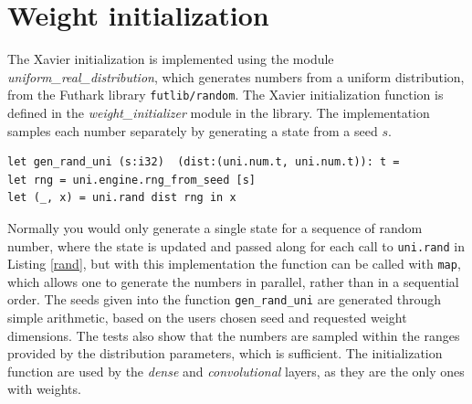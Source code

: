 \section{Weight initialization}
The Xavier initialization is implemented using the module
\textit{uniform\_real\_distribution}, which generates numbers from a uniform
distribution, from the Futhark library \texttt{futlib/random}. 
The Xavier initialization function is defined in the
\textit{weight\_initializer} module in the library. 
The implementation samples each number separately by generating a state from a
seed $s$. 
\begin{lstlisting}[caption = {Function for sampling a uniform number from the
seed $s$, by generating a state in line 2, which is used to sample the number in
line 3}, 	label = {rand} ]
let gen_rand_uni (s:i32)  (dist:(uni.num.t, uni.num.t)): t =
let rng = uni.engine.rng_from_seed [s]
let (_, x) = uni.rand dist rng in x
\end{lstlisting}
Normally you would only generate a single state for a sequence of random number,
where the state is updated and passed along for each call to \texttt{uni.rand}
in Listing \ref{rand}, but with this implementation the function can be called
with \texttt{map}, which allows one to generate the numbers in parallel, rather
than in a sequential order. The seeds given into the function
\texttt{gen\_rand\_uni} are generated through simple arithmetic, based on the
users chosen seed and requested weight dimensions.  The tests also show that the
numbers are sampled within the ranges provided by the distribution parameters,
which is sufficient. 
The initialization function are used by the \emph{dense} and
\emph{convolutional} layers, as they are the only ones with weights. 

